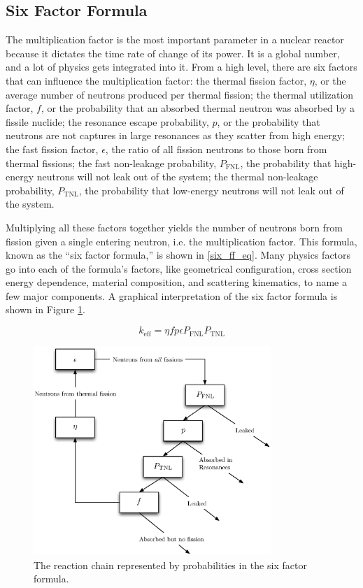 \subsection{Six Factor Formula}

The multiplication factor is the most important parameter in a nuclear reactor because it dictates the time rate of change of its power.  It is a global number, and a lot of physics gets integrated into it.  From a high level, there are six factors that can influence the multiplication factor: 
the thermal fission factor, $\eta$, or the average number of neutrons produced per thermal fission;
the thermal utilization factor, $f$, or the probability that an absorbed thermal neutron was absorbed by a fissile nuclide;
the resonance escape probability, $p$, or the probability that neutrons are not captures in large resonances as they scatter from high energy; 
the fast fission factor, $\epsilon$, the ratio of all fission neutrons to those born from thermal fissions;
the fast non-leakage probability, $P_\mathrm{FNL}$, the probability that high-energy neutrons will not leak out of the system;
the thermal non-leakage probability, $P_\mathrm{TNL}$, the probability that low-energy neutrons will not leak out of the system.

Multiplying all these factors together yields the number of neutrons born from fission given a single entering neutron, i.e. the multiplication factor.  This formula, known as the ``six factor formula,'' is shown in \eqref{six_ff_eq}.  Many physics factors go into each of the formula's factors, like geometrical configuration, cross section energy dependence, material composition, and scattering kinematics, to name a few major components.  A graphical interpretation of the six factor formula is shown in Figure \ref{six_ff_chain}.

\begin{equation}
\label{six_ff_eq}
k_\mathrm{eff}  = \eta f p  \epsilon P_\mathrm{FNL} P_\mathrm{TNL}
\end{equation}


\begin{figure}[h!]
  \centering
    \includegraphics[width=0.8\textwidth]{graphics/six_ff.eps}
     \caption{The reaction chain represented by probabilities in the six factor formula. \label{six_ff_chain}}
\end{figure}

